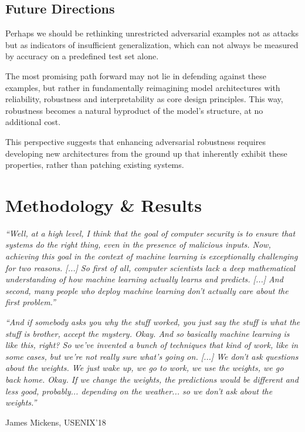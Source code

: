 \documentclass[a4paper, oneside]{discothesis}
\begin{document}
\section{Future Directions}

Perhaps we should be rethinking unrestricted adversarial examples not as attacks but as indicators of insufficient generalization, which can not always be measured by accuracy on a predefined test set alone.

The most promising path forward may not lie in defending against these examples, but rather in fundamentally reimagining model architectures with reliability, robustness and interpretability as core design principles. This way, robustness becomes a natural byproduct of the model's structure, at no additional cost.

This perspective suggests that enhancing adversarial robustness requires developing new architectures from the ground up that inherently exhibit these properties, rather than patching existing systems.

\chapter{Methodology \& Results}

\begin{quotebox}
	\begin{flushright}
		\textit{``Well, at a high level, I think that the goal of computer security is to ensure that systems do the right thing, even in the presence of malicious inputs. Now, achieving this goal in the context of machine learning is exceptionally challenging for two reasons. [...] So first of all, computer scientists lack a deep mathematical understanding of how machine learning actually learns and predicts. [...] And second, many people who deploy machine learning don't actually care about the first problem.''}
		\vspace{1em}

		\textit{``And if somebody asks you why the stuff worked, you just say the stuff is what the stuff is brother, accept the mystery. Okay. And so basically machine learning is like this, right? So we've invented a bunch of techniques that kind of work, like in some cases, but we're not really sure what's going on. [...] We don't ask questions about the weights. We just wake up, we go to work, we use the weights, we go back home. Okay. If we change the weights, the predictions would be different and less good, probably... depending on the weather... so we don't ask about the weights.''}
		\vspace{1em}

		\textemdash{} James Mickens, USENIX'18~\cite{218395}
	\end{flushright}
\end{quotebox}
\end{document}
